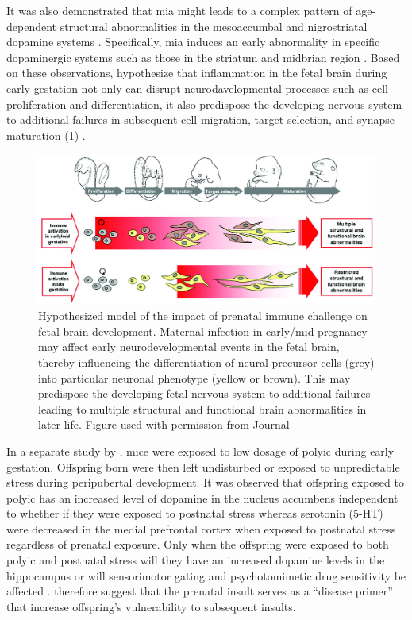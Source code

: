 	It was also demonstrated that \gls{mia} might leads to a complex pattern of age-dependent structural abnormalities in the mesoaccumbal and nigrostriatal dopamine systems \citep{Vuillermot2010}.
	Specifically, \gls{mia} induces an early abnormality in specific dopaminergic systems such as those in the striatum and midbrian region \citep{Vuillermot2010}.
	Based on these observations, \citet{Meyer2007a} hypothesize that inflammation in the fetal brain during early gestation not only can disrupt neurodavelopmental processes such as cell proliferation and differentiation, it also predispose the developing nervous system to additional failures in subsequent cell migration, target selection, and synapse maturation (\cref{fig:miaEffect}) \citep{Meyer2007a}.
	\begin{figure}
		\centering
		\includegraphics[width=\textwidth]{figure/mia_impact.jpg}
		\caption[Hypothesized model of the impact of prenatal immune challenge on fetal brain development]{Hypothesized model of the impact of prenatal immune challenge on fetal brain development.
			Maternal infection in early/mid pregnancy may affect early neurodevelopmental events in the fetal brain, thereby influencing the differentiation of neural precursor cells (grey) into particular neuronal phenotype (yellow or brown).
			This may predispose the developing fetal nervous system to additional failures leading to multiple structural and functional brain abnormalities in later life.
			Figure used with permission from Journal \citep{Meyer2007a}}
		\label{fig:miaEffect}
	\end{figure}
	
	In a separate study by \citet{Giovanoli2013}, mice were exposed to low dosage of \gls{polyic} during early gestation.
	Offspring born were then left undisturbed or exposed to unpredictable stress during peripubertal development.
	It was observed that offspring exposed to \gls{polyic} has an increased level of dopamine in the nucleus accumbens independent to whether if they were exposed to postnatal stress whereas serotonin (5-HT) were decreased in the medial prefrontal cortex when exposed to postnatal stress regardless of prenatal exposure.
	Only when the offspring were exposed to both \gls{polyic} and postnatal stress will they have an increased dopamine levels in the hippocampus or will sensorimotor gating and psychotomimetic drug sensitivity be affected \citep{Giovanoli2013}.
	\citet{Giovanoli2013} therefore suggest that the prenatal insult serves as a ``disease primer'' that increase offspring's vulnerability to subsequent insults.
	

